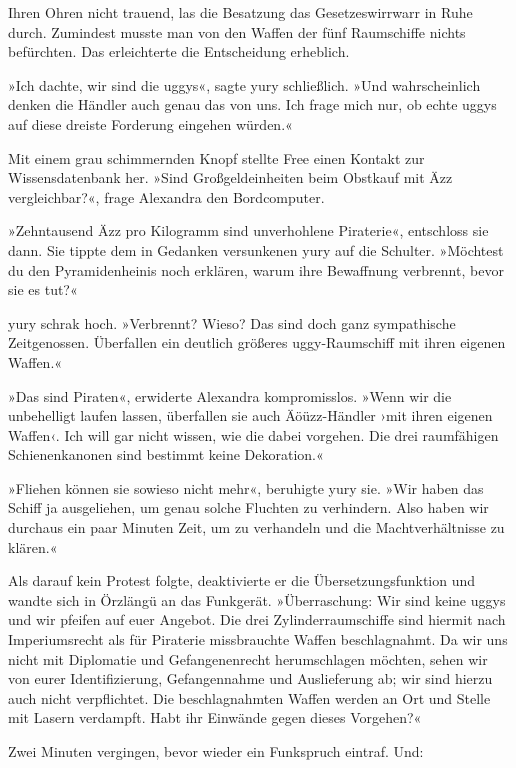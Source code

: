Ihren Ohren nicht trauend, las die Besatzung das Gesetzeswirrwarr in Ruhe durch. Zumindest musste man von den Waffen der fünf Raumschiffe nichts befürchten. Das erleichterte die Entscheidung erheblich.

»Ich dachte, wir sind die uggys«, sagte yury schließlich. »Und wahrscheinlich denken die Händler auch genau das von uns. Ich frage mich nur, ob echte uggys auf diese dreiste Forderung eingehen würden.«

Mit einem grau schimmernden Knopf stellte Free einen Kontakt zur Wissensdatenbank her. »Sind Großgeldeinheiten beim Obstkauf mit Äzz vergleichbar?«, frage Alexandra den Bordcomputer.


»Zehntausend Äzz pro Kilogramm sind unverhohlene Piraterie«, entschloss sie dann. Sie tippte dem in Gedanken versunkenen yury auf die Schulter. »Möchtest du den Pyramidenheinis noch erklären, warum ihre Bewaffnung verbrennt, bevor sie es tut?«

yury schrak hoch. »Verbrennt? Wieso? Das sind doch ganz sympathische Zeitgenossen. Überfallen ein deutlich größeres uggy-Raumschiff mit ihren eigenen Waffen.«

»Das sind Piraten«, erwiderte Alexandra kompromisslos. »Wenn wir die unbehelligt laufen lassen, überfallen sie auch Äöüzz-Händler ›mit ihren eigenen Waffen‹. Ich will gar nicht wissen, wie die dabei vorgehen. Die drei raumfähigen Schienenkanonen sind bestimmt keine Dekoration.«

»Fliehen können sie sowieso nicht mehr«, beruhigte yury sie. »Wir haben das Schiff ja ausgeliehen, um genau solche Fluchten zu verhindern. Also haben wir durchaus ein paar Minuten Zeit, um zu verhandeln und die Machtverhältnisse zu klären.«

Als darauf kein Protest folgte, deaktivierte er die Übersetzungsfunktion und wandte sich in Örzlängü an das Funkgerät. »Überraschung: Wir sind keine uggys und wir pfeifen auf euer Angebot. Die drei Zylinderraumschiffe sind hiermit nach Imperiumsrecht als für Piraterie missbrauchte Waffen beschlagnahmt. Da wir uns nicht mit Diplomatie und Gefangenenrecht herumschlagen möchten, sehen wir von eurer Identifizierung, Gefangennahme und Auslieferung ab; wir sind hierzu auch nicht verpflichtet. Die beschlagnahmten Waffen werden an Ort und Stelle mit Lasern verdampft. Habt ihr Einwände gegen dieses Vorgehen?«

Zwei Minuten vergingen, bevor wieder ein Funkspruch eintraf.  Und: 

